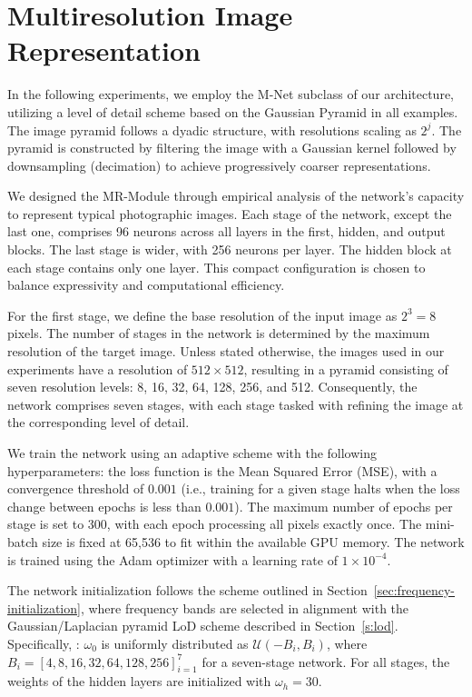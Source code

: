 \section{Multiresolution Image Representation}
\label{s:img}


In the following experiments, we employ the M-Net subclass of our architecture, utilizing a level of detail scheme based on the Gaussian Pyramid in all examples. The image pyramid follows a dyadic structure, with resolutions scaling as \( 2^j \). The pyramid is constructed by filtering the image with a Gaussian kernel followed by downsampling (decimation) to achieve progressively coarser representations.

We designed the MR-Module through empirical analysis of the network's capacity to represent typical photographic images. Each stage of the network, except the last one, comprises 96 neurons across all layers in the first, hidden, and output blocks. The last stage is wider, with 256 neurons per layer. The hidden block at each stage contains only one layer. This compact configuration is chosen to balance expressivity and computational efficiency.

For the first stage, we define the base resolution of the input image as \( 2^3 = 8 \) pixels. The number of stages in the network is determined by the maximum resolution of the target image. Unless stated otherwise, the images used in our experiments have a resolution of \(512 \times 512\), resulting in a pyramid consisting of seven resolution levels: 8, 16, 32, 64, 128, 256, and 512. Consequently, the network comprises seven stages, with each stage tasked with refining the image at the corresponding level of detail.

We train the network using an adaptive scheme with the following hyperparameters: the loss function is the Mean Squared Error (MSE), with a convergence threshold of \(0.001\) (i.e., training for a given stage halts when the loss change between epochs is less than \(0.001\)). The maximum number of epochs per stage is set to 300, with each epoch processing all pixels exactly once. The mini-batch size is fixed at 65,536 to fit within the available GPU memory. The network is trained using the Adam optimizer with a learning rate of \(1 \times 10^{-4}\).

The network initialization follows the scheme outlined in Section~\ref{sec:frequency-initialization}, where frequency bands are selected in alignment with the Gaussian/Laplacian pyramid LoD scheme described in Section~\ref{s:lod}. Specifically, : \(\omega_0\) is uniformly distributed as \( \mathcal{U}(-B_i, B_i)\), where \( B_i = [4, 8, 16, 32, 64, 128, 256]_{i=1}^7 \) for a seven-stage network. For all stages, the weights of the hidden layers are initialized with \(\omega_h = 30\).


